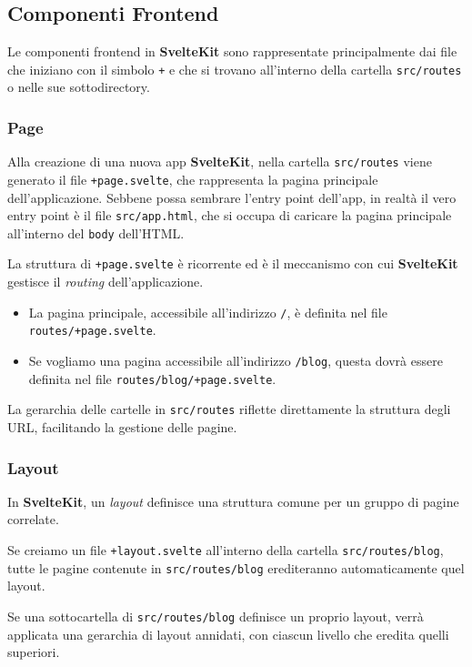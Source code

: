 \documentclass[12pt]{article}
\begin{document}
\subsection{Componenti Frontend}
Le componenti frontend in \textbf{SvelteKit} sono rappresentate
principalmente dai file che iniziano con il simbolo \texttt{+}
e che si trovano all'interno della cartella \texttt{src/routes}
o nelle sue sottodirectory.

\subsubsection{Page}
Alla creazione di una nuova app \textbf{SvelteKit}, nella cartella
\texttt{src/routes} viene generato il file \texttt{+page.svelte},
che rappresenta la pagina principale dell'applicazione.
Sebbene possa sembrare l'entry point dell'app, in realtà
il vero entry point è il file \texttt{src/app.html}, che
si occupa di caricare la pagina principale all'interno del
\texttt{body} dell'HTML.

La struttura di \texttt{+page.svelte} è ricorrente ed è
il meccanismo con cui \textbf{SvelteKit} gestisce il 
\textit{routing} dell’applicazione.

\begin{itemize}
    \item La pagina principale, accessibile all'indirizzo \texttt{/},
    è definita nel file \texttt{routes/+page.svelte}.
    \item Se vogliamo una pagina accessibile all’indirizzo \texttt{/blog},
    questa dovrà essere definita nel file \texttt{routes/blog/+page.svelte}.
\end{itemize}

La gerarchia delle cartelle in \texttt{src/routes} riflette
direttamente la struttura degli URL, facilitando la gestione
delle pagine.

\subsubsection{Layout}  
In \textbf{SvelteKit}, un \textit{layout} definisce una
struttura comune per un gruppo di pagine correlate.

Se creiamo un file \texttt{+layout.svelte} all'interno
della cartella \texttt{src/routes/blog}, tutte le pagine
contenute in \texttt{src/routes/blog} erediteranno
automaticamente quel layout.

Se una sottocartella di \texttt{src/routes/blog} definisce
un proprio layout, verrà applicata una gerarchia di layout
annidati, con ciascun livello che eredita quelli superiori.
\end{document}
